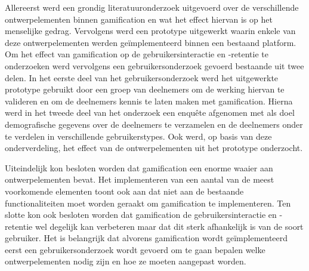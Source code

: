 Allereerst werd een grondig literatuuronderzoek uitgevoerd over de verschillende ontwerpelementen binnen gamification en wat het effect hiervan is op het menselijke gedrag. Vervolgens werd een prototype uitgewerkt waarin enkele van deze ontwerpelementen werden geïmplementeerd binnen een bestaand platform. Om het effect van gamification op de gebruikersinteractie en -retentie te onderzoeken werd vervolgens een gebruikersonderzoek gevoerd bestaande uit twee delen. In het eerste deel van het gebruikersonderzoek werd het uitgewerkte prototype gebruikt door een groep van deelnemers om de werking hiervan te valideren en om de deelnemers kennis te laten maken met gamification. Hierna werd in het tweede deel van het onderzoek een enquête afgenomen met als doel demografische gegevens over de deelnemers te verzamelen en de deelnemers onder te verdelen in verschillende gebruikerstypes. Ook werd, op basis van deze onderverdeling, het effect van de ontwerpelementen uit het prototype onderzocht.

Uiteindelijk kon besloten worden dat gamification een enorme waaier aan ontwerpelementen bevat. Het implementeren van een aantal van de meest voorkomende elementen toont ook aan dat niet aan de bestaande functionaliteiten moet worden geraakt om gamification te implementeren. Ten slotte kon ook besloten worden dat gamification de gebruikersinteractie en -retentie wel degelijk kan verbeteren maar dat dit sterk afhankelijk is van de soort gebruiker. Het is belangrijk dat alvorens gamification wordt geïmplementeerd eerst een gebruikersonderzoek wordt gevoerd om te gaan bepalen welke ontwerpelementen nodig zijn en hoe ze moeten aangepast worden.
